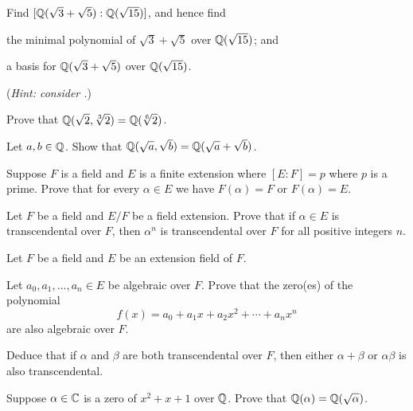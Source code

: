 \begin{problem}
    Find $[\mathbb{Q}(\sqrt3+\sqrt5):\mathbb{Q}(\sqrt{15})]$, and hence find
    \begin{partquestions}{\alph*}
        \item the minimal polynomial of $\sqrt3 + \sqrt5$ over $\mathbb{Q}(\sqrt{15})$; and
        \item a basis for $\mathbb{Q}(\sqrt3+\sqrt5)$ over $\mathbb{Q}(\sqrt{15})$.
    \end{partquestions}
    (\textit{Hint: consider .})
\end{problem}

\begin{problem}
    Prove that $\mathbb{Q}(\sqrt2,\sqrt[3]2) = \mathbb{Q}(\sqrt[6]2)$.
\end{problem}

\begin{problem}
    Let $a, b \in \mathbb{Q}$. Show that $\mathbb{Q}(\sqrt a, \sqrt b) = \mathbb{Q}(\sqrt a + \sqrt b)$.
\end{problem}

\begin{problem}
    Suppose $F$ is a field and $E$ is a finite extension where $[E:F] = p$ where $p$ is a prime. Prove that for every $\alpha \in E$ we have $F(\alpha) = F$ or $F(\alpha) = E$.
\end{problem}

\begin{problem}
    Let $F$ be a field and $E/F$ be a field extension. Prove that if $\alpha \in E$ is transcendental over $F$, then $\alpha^n$ is transcendental over $F$ for all positive integers $n$.
\end{problem}

\begin{problem}
    Let $F$ be a field and $E$ be an extension field of $F$.
    \begin{partquestions}{\roman*}
        \item Let $a_0, a_1, \dots, a_n \in E$ be algebraic over $F$. Prove that the zero(es) of the polynomial
        \[
            f(x) = a_0 + a_1x + a_2x^2 + \cdots + a_nx^n
        \]
        are also algebraic over $F$.

        \item Deduce that if $\alpha$ and $\beta$ are both transcendental over $F$, then either $\alpha+\beta$ or $\alpha\beta$ is also transcendental.
    \end{partquestions}
\end{problem}

\begin{problem}
    Suppose $\alpha \in \mathbb{C}$ is a zero of $x^2 + x + 1$ over $\mathbb{Q}$. Prove that $\mathbb{Q}(\alpha) = \mathbb{Q}(\sqrt{\alpha})$.
\end{problem}

